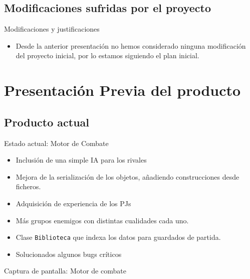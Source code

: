 \documentclass[9pt,xcolor=svgnames]{beamer}
\begin{document}
   
   
   \subsection{Modificaciones sufridas por el proyecto}
   
   \begin{frame}{Modificaciones y justificaciones}
    
    \begin{itemize}
     \item Desde la anterior presentación no hemos considerado
	   ninguna modificación del proyecto inicial, por lo
	   estamos siguiendo el plan inicial.
	 
     \end{itemize}
    
    
   \end{frame}
   
   
 \section{Presentación Previa del producto}
 
   \subsection{Producto actual}

   \begin{frame}{Estado actual: Motor de Combate}
    \begin{itemize}
     \item Inclusión de una simple IA para los rivales
     \item Mejora de la serialización de los objetos, añadiendo
	   construcciones desde ficheros.
     \item Adquisición de experiencia de los PJs
     \item Más grupos enemigos con distintas cualidades cada uno.
     \item Clase \texttt{Biblioteca} que indexa los datos para 
	   guardados de partida.
     \item Solucionados algunos bugs críticos
    \end{itemize}
   \end{frame}

   \begin{frame}{Captura de pantalla: Motor de combate}
    
   \end{frame}
\end{document}
